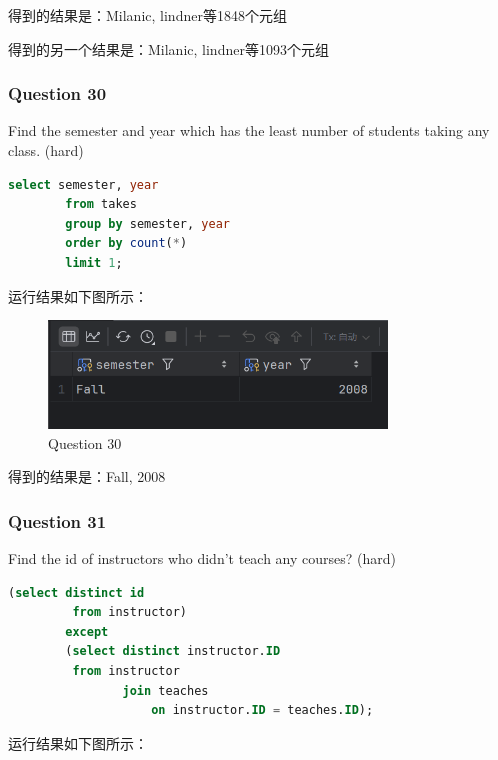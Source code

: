 \documentclass{article}
\begin{document}
    得到的结果是：Milanic, lindner等1848个元组
    
    
    得到的另一个结果是：Milanic, lindner等1093个元组
    
    \subsubsection{Question 30}
    
    Find the semester and year which has the least number of students taking any class.  (hard)
    
    \begin{lstlisting}[language=sql, title=Question 30, tabsize=4]
    	select semester, year
    	from takes
    	group by semester, year
    	order by count(*)
    	limit 1;
    \end{lstlisting}
    
    运行结果如下图所示：
    
    \begin{figure}[H]
    	\centering
    	\includegraphics[width=9cm]{./images/34.Question30.png}
    	\caption{Question 30}
    \end{figure}
    
    得到的结果是：Fall, 2008
    
    \subsubsection{Question 31}
    
    Find the id of instructors who didn't teach any courses?  (hard)
    
    \begin{lstlisting}[language=sql, title=Question 31, tabsize=4]
    	(select distinct id
    	 from instructor)
    	except
    	(select distinct instructor.ID
    	 from instructor
    			join teaches
    				on instructor.ID = teaches.ID);
    \end{lstlisting}
    
    运行结果如下图所示：
    
\end{document}
